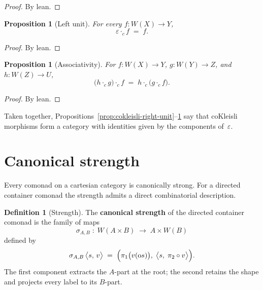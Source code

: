 \documentclass[11pt,a4paper]{article}
\theoremstyle{plain}
\newtheorem{proposition}[theorem]{Proposition}
\theoremstyle{definition}
\newtheorem{definition}[theorem]{Definition}
\newcommand{\rootp}{\mathrm{o}}
\begin{document}
\begin{proof}
By lean.
\end{proof}

\begin{proposition}[Left unit]\label{prop:cokleisli-left-unit}
For every $f : W(X) \to Y$,
\begin{equation}
  \varepsilon \mathbin{\cdot_c} f \;=\; f.
\end{equation}
\end{proposition}

\begin{proof}
By lean.
\end{proof}

\begin{proposition}[Associativity]\label{prop:cokleisli-assoc}
For $f : W(X) \to Y$, $g : W(Y) \to Z$, and $h : W(Z) \to U$,
\begin{equation}
  \bigl(h \mathbin{\cdot_c} g\bigr) \mathbin{\cdot_c} f
  \;=\;
  h \mathbin{\cdot_c} \bigl(g \mathbin{\cdot_c} f\bigr).
\end{equation}
\end{proposition}

\begin{proof}
By lean.
\end{proof}

Taken together, Propositions~\ref{prop:cokleisli-right-unit}--\ref{prop:cokleisli-assoc}
say that coKleisli morphisms form a category with identities given by the
components of~$\varepsilon$.

\section{Canonical strength}

Every comonad on a cartesian category is canonically strong. For a directed
container comonad the strength admits a direct combinatorial description.

\begin{definition}[Strength]\label{def:strength}
The \textbf{canonical strength} of the directed container comonad is the
family of maps
\begin{equation}
  \sigma_{A,B} \;:\; W(A \times B) \;\longrightarrow\; A \times W(B)
\end{equation}
defined by
\begin{equation}
  \sigma_{A,B}\,\bigl\langle s,\, v \bigr\rangle
  \;=\;
  \Bigl(
    \pi_1\bigl(v(\rootp s)\bigr),\;
    \bigl\langle s,\; \pi_2 \circ v \bigr\rangle
  \Bigr).
\end{equation}
The first component extracts the $A$-part at the root; the second retains the
shape and projects every label to its $B$-part.
\end{definition}
\end{document}
